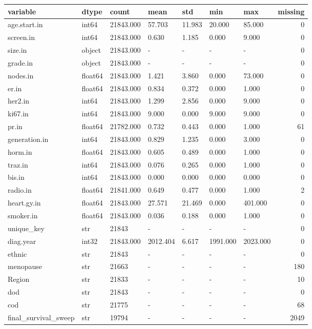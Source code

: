 \begin{tabular}{lllllllr}
\toprule
variable & dtype & count & mean & std & min & max & missing \\
\midrule
age.start.in & int64 & 21843.000 & 57.703 & 11.983 & 20.000 & 85.000 & 0 \\
screen.in & int64 & 21843.000 & 0.630 & 1.185 & 0.000 & 9.000 & 0 \\
size.in & object & 21843.000 & - & - & - & - & 0 \\
grade.in & object & 21843.000 & - & - & - & - & 0 \\
nodes.in & float64 & 21843.000 & 1.421 & 3.860 & 0.000 & 73.000 & 0 \\
er.in & float64 & 21843.000 & 0.834 & 0.372 & 0.000 & 1.000 & 0 \\
her2.in & int64 & 21843.000 & 1.299 & 2.856 & 0.000 & 9.000 & 0 \\
ki67.in & int64 & 21843.000 & 9.000 & 0.000 & 9.000 & 9.000 & 0 \\
pr.in & float64 & 21782.000 & 0.732 & 0.443 & 0.000 & 1.000 & 61 \\
generation.in & int64 & 21843.000 & 0.829 & 1.235 & 0.000 & 3.000 & 0 \\
horm.in & float64 & 21843.000 & 0.605 & 0.489 & 0.000 & 1.000 & 0 \\
traz.in & int64 & 21843.000 & 0.076 & 0.265 & 0.000 & 1.000 & 0 \\
bis.in & int64 & 21843.000 & 0.000 & 0.000 & 0.000 & 0.000 & 0 \\
radio.in & float64 & 21841.000 & 0.649 & 0.477 & 0.000 & 1.000 & 2 \\
heart.gy.in & float64 & 21843.000 & 27.571 & 21.469 & 0.000 & 401.000 & 0 \\
smoker.in & float64 & 21843.000 & 0.036 & 0.188 & 0.000 & 1.000 & 0 \\
unique\_key & str & 21843 & - & - & - & - & 0 \\
diag.year & int32 & 21843.000 & 2012.404 & 6.617 & 1991.000 & 2023.000 & 0 \\
ethnic & str & 21843 & - & - & - & - & 0 \\
menopause & str & 21663 & - & - & - & - & 180 \\
Region & str & 21833 & - & - & - & - & 10 \\
dod & str & 21843 & - & - & - & - & 0 \\
cod & str & 21775 & - & - & - & - & 68 \\
final\_survival\_sweep & str & 19794 & - & - & - & - & 2049 \\

\end{tabular}

